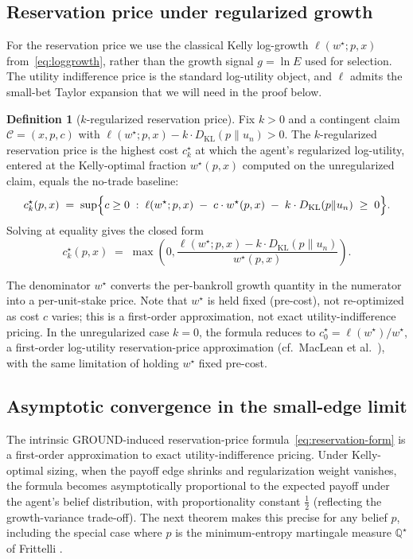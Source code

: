 \documentclass[11pt]{article}
\theoremstyle{definition}
\newtheorem{definition}[theorem]{Definition}
\theoremstyle{remark}
\newcommand{\Q}{\mathbb{Q}}
\newcommand{\C}{\mathcal{C}}
\newcommand{\KL}{D_{\mathrm{KL}}}
\begin{document}
\subsection{Reservation price under regularized growth}

For the reservation price we use the classical Kelly log-growth
$\ell(w^\star; p, x)$ from~\eqref{eq:loggrowth}, rather than the
growth signal $g = \ln E$ used for selection. The utility
indifference price is the standard log-utility object, and
$\ell$ admits the small-bet Taylor expansion that we will need in
the proof below.

\begin{definition}[$k$-regularized reservation price]\label{def:reservation}
Fix $k > 0$ and a contingent claim $\C = (x, p, c)$ with
$\ell(w^\star; p, x) - k \cdot \KL(p \| u_n) > 0$. The $k$-regularized reservation price is
the highest cost $c^\star_k$ at which the agent's regularized
log-utility, entered at the Kelly-optimal fraction $w^\star(p,x)$ computed
on the unregularized claim, equals the no-trade baseline:
\begin{equation}
c^\star_k(p, x) \;=\; \sup \Bigl\{ c \ge 0 \;:\; \ell(w^\star; p, x) \;-\; c \cdot w^\star(p, x)
    \;-\; k \cdot \KL(p \| u_n) \;\ge\; 0 \Bigr\}.
\label{eq:reservation}
\end{equation}
Solving at equality gives the closed form
\begin{equation}
c^\star_k(p, x) \;=\; \max\left(0, \frac{\ell(w^\star; p, x) - k \cdot \KL(p \| u_n)}{w^\star(p, x)}\right).
\label{eq:reservation-form}
\end{equation}
\end{definition}

The denominator $w^\star$ converts the per-bankroll growth quantity
in the numerator into a per-unit-stake price. Note that $w^\star$ is held
fixed (pre-cost), not re-optimized as cost $c$ varies; this is a first-order approximation,
not exact utility-indifference pricing. In the unregularized
case $k = 0$, the formula reduces to $c^\star_0 = \ell(w^\star) / w^\star$, a first-order log-utility reservation-price approximation (cf.\ MacLean et al.\ \cite{maclean2011}), with the same limitation of holding $w^\star$ fixed pre-cost.

\subsection{Asymptotic convergence in the small-edge limit}

The intrinsic GROUND-induced reservation-price formula~\eqref{eq:reservation-form} is a first-order
approximation to exact utility-indifference pricing. Under Kelly-optimal sizing, when the payoff edge shrinks
and regularization weight vanishes, the formula becomes asymptotically proportional to the expected payoff
under the agent's belief distribution, with proportionality constant $\tfrac{1}{2}$ (reflecting the growth-variance trade-off).
The next theorem makes this precise for any belief $p$, including the special case where $p$ is the minimum-entropy martingale
measure $\Q^\star$ of Frittelli \cite{frittelli2000}.
\end{document}
